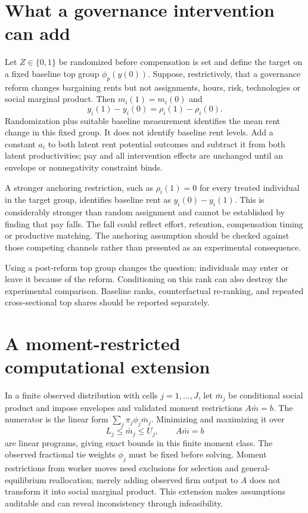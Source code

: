 \documentclass[11pt]{article}
\begin{document}
\section{What a governance intervention can add}
Let $Z\in\{0,1\}$ be randomized before compensation is set and define the target on a fixed baseline top group $\phi_p(y(0))$. Suppose, restrictively, that a governance reform changes bargaining rents but not assignments, hours, risk, technologies or social marginal product. Then $m_i(1)=m_i(0)$ and
\[
 y_i(1)-y_i(0)=\rho_i(1)-\rho_i(0).
\]
Randomization plus suitable baseline measurement identifies the mean rent change in this fixed group. It does not identify baseline rent levels. Add a constant $a_i$ to both latent rent potential outcomes and subtract it from both latent productivities; pay and all intervention effects are unchanged until an envelope or nonnegativity constraint binds.

A stronger anchoring restriction, such as $\rho_i(1)=0$ for every treated individual in the target group, identifies baseline rent as $y_i(0)-y_i(1)$. This is considerably stronger than random assignment and cannot be established by finding that pay falls. The fall could reflect effort, retention, compensation timing or productive matching. The anchoring assumption should be checked against those competing channels rather than presented as an experimental consequence.

Using a post-reform top group changes the question: individuals may enter or leave it because of the reform. Conditioning on this rank can also destroy the experimental comparison. Baseline ranks, counterfactual re-ranking, and repeated cross-sectional top shares should be reported separately.

\section{A moment-restricted computational extension}
In a finite observed distribution with cells $j=1,\ldots,J$, let $\bar m_j$ be conditional social product and impose envelopes and validated moment restrictions $A\bar m=b$. The numerator is the linear form $\sum_j\pi_j\phi_j\bar m_j$. Minimizing and maximizing it over
\[
 L_j\leq\bar m_j\leq U_j,\qquad A\bar m=b
\]
are linear programs, giving exact bounds in this finite moment class. The observed fractional tie weights $\phi_j$ must be fixed before solving. Moment restrictions from worker moves need exclusions for selection and general-equilibrium reallocation; merely adding observed firm output to $A$ does not transform it into social marginal product. This extension makes assumptions auditable and can reveal inconsistency through infeasibility.
\end{document}
